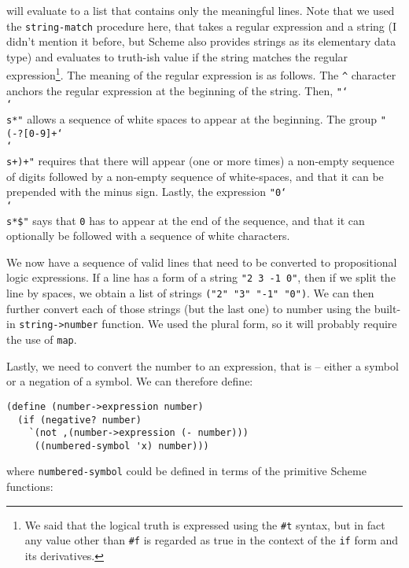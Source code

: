 will evaluate to a list that contains only the meaningful
lines. Note that we used the \texttt{string-match} procedure
here, that takes a regular expression and a string (I
didn't mention it before, but Scheme also provides strings as
its elementary data type) and evaluates to truth-ish value
if the string matches the regular expression\footnote{
We said that the logical truth is expressed using the
\texttt{\#t} syntax, but in fact any value other than
\texttt{\#f} is regarded as true in the context of the
\texttt{if} form and its derivatives.}. The meaning
of the regular expression is as follows. The \texttt{\string^}
character anchors the regular expression at the beginning
of the string. Then, \texttt{"\char`\\\char`\\s*"} allows a sequence
of white spaces to appear at the beginning. The group
\texttt{"(-?[0-9]+\char`\\\char`\\s+)+"} requires that there
will appear (one or more times) a non-empty sequence of digits followed
by a non-empty sequence of white-spaces, and that it can be
prepended with the minus sign. Lastly, the expression
\texttt{"0\char`\\\char`\\s*\$"} says that \texttt{0} has to appear
at the end of the sequence, and that it can optionally be
followed with a sequence of white characters.

We now have a sequence of valid lines that need to be
converted to propositional logic expressions. If a line has
a form of a string \texttt{"2 3 -1 0"}, then if we split
the line by spaces, we obtain a list of strings
\texttt{("2" "3" "-1" "0")}. We can then further
convert each of those strings (but the last one) to number
using the built-in \texttt{string->number} function. We used
the plural form, so it will probably require the use
of \texttt{map}.

Lastly, we need to convert the number to an expression,
that is -- either a symbol or a negation of a symbol.
We can therefore define:

\begin{Verbatim}[samepage=true]
(define (number->expression number)
  (if (negative? number)
    `(not ,(number->expression (- number)))
     ((numbered-symbol 'x) number)))
\end{Verbatim}

where \texttt{numbered-symbol} could be defined in
terms of the primitive Scheme functions:

